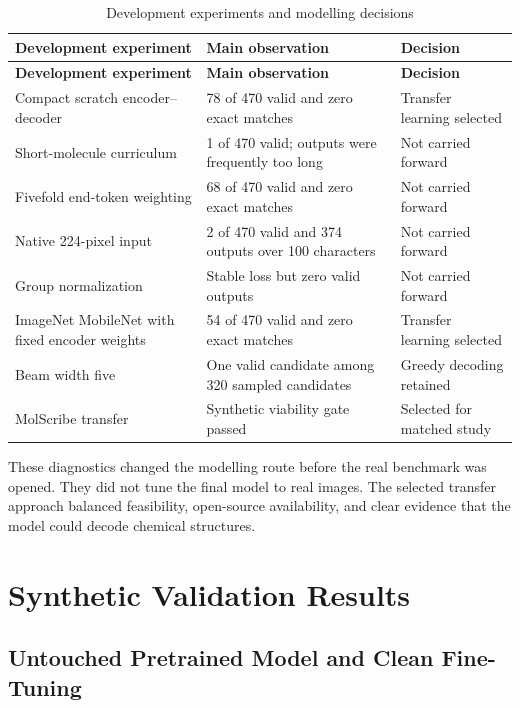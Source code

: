 \documentclass[11pt,a4paper]{article}
\begin{document}
\begin{longtable}{L{3.5cm}L{6.2cm}L{3.1cm}}
\caption{Development experiments and modelling decisions}\label{tab:development}\\
\toprule
\textbf{Development experiment} & \textbf{Main observation} & \textbf{Decision} \\
\midrule
\endfirsthead
\toprule
\textbf{Development experiment} & \textbf{Main observation} & \textbf{Decision} \\
\midrule
\endhead
Compact scratch encoder--decoder & 78 of 470 valid and zero exact matches & Transfer learning selected \\
Short-molecule curriculum & 1 of 470 valid; outputs were frequently too long & Not carried forward \\
Fivefold end-token weighting & 68 of 470 valid and zero exact matches & Not carried forward \\
Native 224-pixel input & 2 of 470 valid and 374 outputs over 100 characters & Not carried forward \\
Group normalization & Stable loss but zero valid outputs & Not carried forward \\
ImageNet MobileNet with fixed encoder weights & 54 of 470 valid and zero exact matches & Transfer learning selected \\
Beam width five & One valid candidate among 320 sampled candidates & Greedy decoding retained \\
MolScribe transfer & Synthetic viability gate passed & Selected for matched study \\
\bottomrule
\end{longtable}

These diagnostics changed the modelling route before the real benchmark was opened. They did
not tune the final model to real images. The selected transfer approach balanced feasibility,
open-source availability, and clear evidence that the model could decode chemical structures.

\section*{Synthetic Validation Results}

\subsection*{Untouched Pretrained Model and Clean Fine-Tuning}
\end{document}
